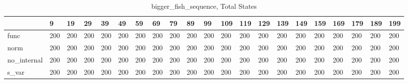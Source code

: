\begin{table}
\centering
\caption{bigger_fish_sequence, Total States}
\label{bigger_fish_sequence_total}
\begin{tabular}{lllllllllllllllllllll}
\toprule
{} &    9 &   19 &   29 &   39 &   49 &   59 &   69 &   79 &   89 &   99 &  109 &  119 &  129 &  139 &  149 &  159 &  169 &  179 &  189 &  199 \\
\midrule
func        &  200 &  200 &  200 &  200 &  200 &  200 &  200 &  200 &  200 &  200 &  200 &  200 &  200 &  200 &  200 &  200 &  200 &  200 &  200 &  200 \\
norm        &  200 &  200 &  200 &  200 &  200 &  200 &  200 &  200 &  200 &  200 &  200 &  200 &  200 &  200 &  200 &  200 &  200 &  200 &  200 &  200 \\
no\_internal &  200 &  200 &  200 &  200 &  200 &  200 &  200 &  200 &  200 &  200 &  200 &  200 &  200 &  200 &  200 &  200 &  200 &  200 &  200 &  200 \\
s\_var       &  200 &  200 &  200 &  200 &  200 &  200 &  200 &  200 &  200 &  200 &  200 &  200 &  200 &  200 &  200 &  200 &  200 &  200 &  200 &  200 \\
\bottomrule
\end{tabular}
\end{table}
